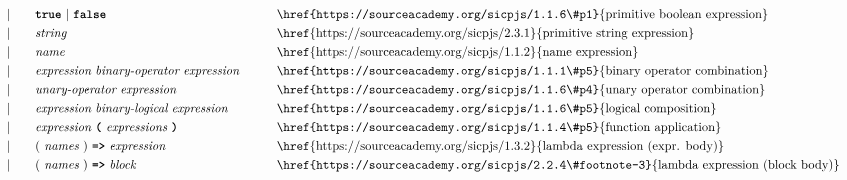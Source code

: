 \begin{alignat*}{9}
&&                       && |   &\quad && \textbf{\texttt{true}}\ |\ \textbf{\texttt{false}}
                                                           && \textrm{\href{https://sourceacademy.org/sicpjs/1.1.6\#p1}{primitive boolean expression}}\\
&&                       && |   &\quad &&  \textit{string}   && \textrm{\href{https://sourceacademy.org/sicpjs/2.3.1}{primitive string expression}}\\
&&                       && |   &\quad &&  \textit{name}   && \textrm{\href{https://sourceacademy.org/sicpjs/1.1.2}{name expression}}\\
&&                       && |   &\quad &&  \textit{expression} \  \textit{binary-operator} \ 
                                            \textit{expression} \qquad
                                                           && \textrm{\href{https://sourceacademy.org/sicpjs/1.1.1\#p5}{binary operator combination}}\\
&&                       && |   &\quad &&   \textit{unary-operator} \ 
                                            \textit{expression}
                                                           && \textrm{\href{https://sourceacademy.org/sicpjs/1.1.6\#p4}{unary operator combination}}\\
&&                       && |   &\quad &&  \textit{expression} \  \textit{binary-logical} \ 
                                            \textit{expression} \qquad
                                                           && \textrm{\href{https://sourceacademy.org/sicpjs/1.1.6\#p5}{logical composition}}\\
&&                       && |   &\quad &&   \textit{expression}\ \textbf{\texttt{(}}\ \textit{expressions}\ \textbf{\texttt{)}}
                                                           && \textrm{\href{https://sourceacademy.org/sicpjs/1.1.4\#p5}{function application}}\\
&&                       && |   &\quad &&   (\ \textit{names}\ )\    
                                            \texttt{\textbf{=>}}\ \textit{expression}
                                                           && \textrm{\href{https://sourceacademy.org/sicpjs/1.3.2}{lambda expression (expr. body)}}\\
&&                       && |   &\quad &&   (\ \textit{names}\ )\    
                                            \texttt{\textbf{=>}}\ \textit{block}
                                                           && \textrm{\href{https://sourceacademy.org/sicpjs/2.2.4\#footnote-3}{lambda expression (block body)}}\\

\end{alignat*}
